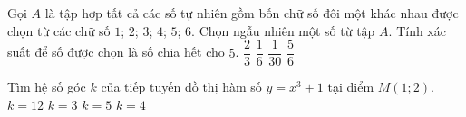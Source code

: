 \begin{ex}%
Gọi $A$ là tập hợp tất cả các số tự nhiên gồm bốn chữ số đôi một khác nhau được chọn từ các chữ số $1$; $2$; $3$; $4$; $5$; $6$. Chọn ngẫu nhiên một số từ tập $A$. Tính xác suất để số được chọn là số chia hết cho $5$.
\choice
{$\dfrac{2}{3}$}
{\True $\dfrac{1}{6}$}
{$\dfrac{1}{30}$}
{$\dfrac{5}{6}$}
\end{ex}

\begin{ex}%
Tìm hệ số góc $k$ của tiếp tuyến đồ thị hàm số $y=x^3+1$ tại điểm $M(1;2)$.
\choice
{$k=12$}
{\True $k=3$}
{$k=5$}
{$k=4$}
\end{ex}

